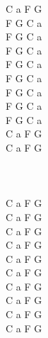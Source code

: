 \documentclass[a5paper, 10pt]{book}
\begin{document}
\begin{minipage}[t]{0.2\textwidth}
  C a F G\\

  F G C a\\
  F G C a\\
  F G C a\\
  F G C a\\
  F G C a\\
  F G C a\\
  F G C a\\
  F G C a\\

  C a F G\\

  C a F G\\
  \\
  \\
  \\
  C a F G\\
  C a F G\\

  C a F G\\
  C a F G\\
  C a F G\\
  C a F G\\

  C a F G\\
  C a F G\\
  C a F G\\
  C a F G\\

\end{minipage}


\end{document}
